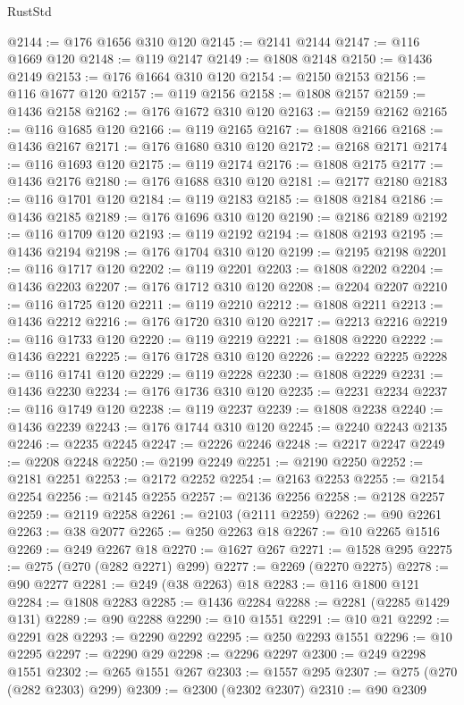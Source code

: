 \begin{lexlean}{RustStd}
\begin{coremodule}
@2144 := @176 @1656 @310 @120
@2145 := @2141 @2144
@2147 := @116 @1669 @120
@2148 := @119 @2147
@2149 := @1808 @2148
@2150 := @1436 @2149
@2153 := @176 @1664 @310 @120
@2154 := @2150 @2153
@2156 := @116 @1677 @120
@2157 := @119 @2156
@2158 := @1808 @2157
@2159 := @1436 @2158
@2162 := @176 @1672 @310 @120
@2163 := @2159 @2162
@2165 := @116 @1685 @120
@2166 := @119 @2165
@2167 := @1808 @2166
@2168 := @1436 @2167
@2171 := @176 @1680 @310 @120
@2172 := @2168 @2171
@2174 := @116 @1693 @120
@2175 := @119 @2174
@2176 := @1808 @2175
@2177 := @1436 @2176
@2180 := @176 @1688 @310 @120
@2181 := @2177 @2180
@2183 := @116 @1701 @120
@2184 := @119 @2183
@2185 := @1808 @2184
@2186 := @1436 @2185
@2189 := @176 @1696 @310 @120
@2190 := @2186 @2189
@2192 := @116 @1709 @120
@2193 := @119 @2192
@2194 := @1808 @2193
@2195 := @1436 @2194
@2198 := @176 @1704 @310 @120
@2199 := @2195 @2198
@2201 := @116 @1717 @120
@2202 := @119 @2201
@2203 := @1808 @2202
@2204 := @1436 @2203
@2207 := @176 @1712 @310 @120
@2208 := @2204 @2207
@2210 := @116 @1725 @120
@2211 := @119 @2210
@2212 := @1808 @2211
@2213 := @1436 @2212
@2216 := @176 @1720 @310 @120
@2217 := @2213 @2216
@2219 := @116 @1733 @120
@2220 := @119 @2219
@2221 := @1808 @2220
@2222 := @1436 @2221
@2225 := @176 @1728 @310 @120
@2226 := @2222 @2225
@2228 := @116 @1741 @120
@2229 := @119 @2228
@2230 := @1808 @2229
@2231 := @1436 @2230
@2234 := @176 @1736 @310 @120
@2235 := @2231 @2234
@2237 := @116 @1749 @120
@2238 := @119 @2237
@2239 := @1808 @2238
@2240 := @1436 @2239
@2243 := @176 @1744 @310 @120
@2245 := @2240 @2243 @2135
@2246 := @2235 @2245
@2247 := @2226 @2246
@2248 := @2217 @2247
@2249 := @2208 @2248
@2250 := @2199 @2249
@2251 := @2190 @2250
@2252 := @2181 @2251
@2253 := @2172 @2252
@2254 := @2163 @2253
@2255 := @2154 @2254
@2256 := @2145 @2255
@2257 := @2136 @2256
@2258 := @2128 @2257
@2259 := @2119 @2258
@2261 := @2103 (@2111 @2259)
@2262 := @90 @2261
@2263 := @38 @2077
@2265 := @250 @2263 @18
@2267 := @10 @2265 @1516
@2269 := @249 @2267 @18
@2270 := @1627 @267
@2271 := @1528 @295
@2275 := @275 (@270 (@282 @2271) @299)
@2277 := @2269 (@2270 @2275)
@2278 := @90 @2277
@2281 := @249 (@38 @2263) @18
@2283 := @116 @1800 @121
@2284 := @1808 @2283
@2285 := @1436 @2284
@2288 := @2281 (@2285 @1429 @131)
@2289 := @90 @2288
@2290 := @10 @1551
@2291 := @10 @21
@2292 := @2291 @28
@2293 := @2290 @2292
@2295 := @250 @2293 @1551
@2296 := @10 @2295
@2297 := @2290 @29
@2298 := @2296 @2297
@2300 := @249 @2298 @1551
@2302 := @265 @1551 @267
@2303 := @1557 @295
@2307 := @275 (@270 (@282 @2303) @299)
@2309 := @2300 (@2302 @2307)
@2310 := @90 @2309

\end{coremodule}
\end{lexlean}
